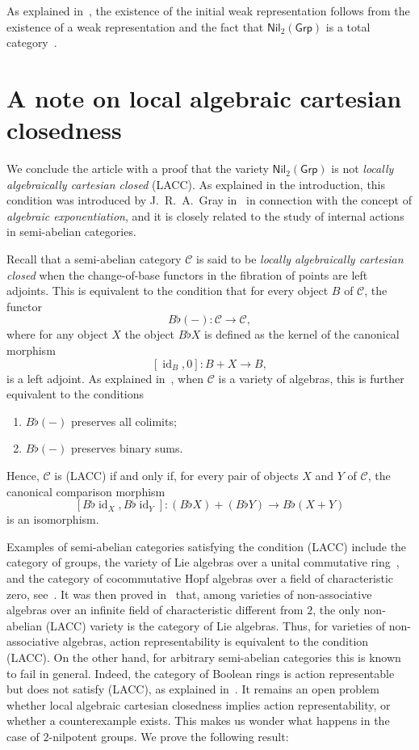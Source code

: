 \documentclass[reqno,hidelinks,a4paper]{amsart}
\theoremstyle{plain}
\theoremstyle{definition}
\theoremstyle{remark}
\numberwithin{equation}{section}
\newcommand*{\CondName}[1]{{\rm (#1)}}
\newcommand*{\LACC}{\CondName{LACC}}
\newcommand{\C}{\ensuremath{\mathcal{C}}}
\DeclareMathOperator{\id}{id}
\newcommand{\Grp}{\ensuremath{\mathsf{Grp}}}
\newcommand{\Nil}{\ensuremath{\mathsf{Nil}}}
\begin{document}
As explained in~\cite[Corollary~5.3 and Corollary 5.4]{WRA}, the existence of the initial weak representation follows from the existence of a weak representation and the fact that \(\Nil_2(\Grp)\) is a total category~\cite{Street}.


\section{A note on local algebraic cartesian closedness}\label{sec_LACC}

We conclude the article with a proof that the variety \(\Nil_2(\Grp)\) is not \emph{locally algebraically cartesian closed} \LACC{}. As explained in the introduction, this condition was introduced by J.~R.~A.~Gray in~\cite{GrayThesis} in connection with the concept of \emph{algebraic exponentiation}, and it is closely related to the study of internal actions in semi-abelian categories.

Recall that a semi-abelian category \(\C\) is said to be \emph{locally algebraically cartesian closed} when the change-of-base functors in the fibration of points are left adjoints. This is equivalent to the condition that for every object \(B\) of \(\C\), the functor
\[
    B\flat(-)\colon \C \to \C,
\]
where for any object \(X\) the object \(B\flat X\) is defined as the kernel of the canonical morphism
\[
    [\id_B,0]\colon B+X\to B,
\]
is a left adjoint. As explained in~\cite{GrayACS}, when \(\C\) is a variety of algebras, this is further equivalent to the conditions
\begin{enumerate}
    \item \(B\flat(-)\) preserves all colimits;
    \item \(B\flat(-)\) preserves binary sums.
\end{enumerate}
Hence, \(\C\) is \LACC{} if and only if, for every pair of objects \(X\) and \(Y\) of \(\C\), the canonical comparison morphism
\begin{equation}\label{comparison}
    [B \flat \id_X, B \flat \id_Y] \colon (B\flat X)+(B\flat Y)\to B\flat(X+Y)
\end{equation}
is an isomorphism.

Examples of semi-abelian categories satisfying the condition \LACC{} include the category of groups, the variety of Lie algebras over a unital commutative ring~\cite{GrayLie}, and the category of cocommutative Hopf algebras over a field of characteristic zero, see~\cite{acc, hopf}. It was then proved in~\cite{GM-VdL3} that, among varieties of non-associative algebras over an infinite field of characteristic different from \(2\), the only non-abelian \LACC{} variety is the category of Lie algebras. Thus, for varieties of non-associative algebras, action representability is equivalent to the condition \LACC{}. On the other hand, for arbitrary semi-abelian categories this is known to fail in general. Indeed, the category of Boolean rings is action representable~\cite{BJK2} but does not satisfy \LACC{}, as explained in~\cite[Proposition 6.4]{GrayACS}. It remains an open problem whether local algebraic cartesian closedness implies action representability, or whether a counterexample exists. This makes us wonder what happens in the case of \(2\)-nilpotent groups. We prove the following result:
\end{document}
